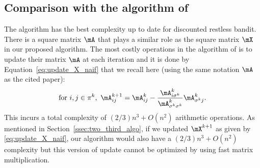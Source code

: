 
\subsection{Comparison with the algorithm of \texorpdfstring{\cite{nino2020fast}}{Nino Mora 2020}}
The algorithm \cite{nino2020fast} has the best complexity up to date for discounted restless bandit. There is a square matrix $\mA$ that plays a similar role as the square matrix $\mX$ in our proposed algorithm. The most costly operations in the algorithm of \cite{nino2020fast} is to update their matrix $\mA$ at each iteration and it is done by Equation~\eqref{eq:update_X_naif} that we recall here (using the same notation $\mA$ as the cited paper):
\begin{align}
    \label{eq:15}
    \text{for } i,j\in\pi^k,\ \mA^{k+1}_{ij}= \mA^{k}_{ij} -\frac{\mA^{k}_{i\sigma^k}}{\mA^{k}_{\sigma^k\sigma^k}}\mA^{k}_{\sigma^kj}.
\end{align}
This incurs a total complexity of $(2/3)n^3+O(n^2)$ arithmetic operations.
As mentioned in Section~\ref{ssec:two_third_algo}, if we updated $\mX^{k+1}$ as given by \eqref{eq:update_X_naif}, our algorithm would also have a $(2/3)n^3+O(n^2)$ complexity but this version of update cannot be optimized by using  fast matrix multiplication.

